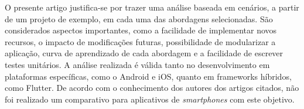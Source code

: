 O presente artigo justifica-se por trazer uma análise baseada em cenários, a partir de um projeto de exemplo, em cada uma das abordagens selecionadas.
São considerados aspectos importantes, como a facilidade de implementar novos recursos, o impacto de modificações futuras, possibilidade de modularizar a aplicação, curva de aprendizado de cada abordagem e a facilidade de escrever testes unitários.
A análise realizada é válida tanto no desenvolvimento em plataformas específicas, como o Android e iOS, quanto em frameworks híbridos, como Flutter.
De acordo com o conhecimento dos autores dos artigos citados, não foi realizado um comparativo para aplicativos de \emph{smartphones} com este objetivo.
